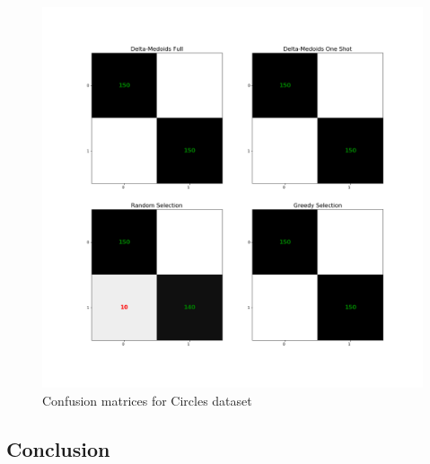 \documentclass[thesis=B,english]{FITthesis}[2012/10/20]
\begin{document}
\begin{figure}[H]
   \includegraphics[width=\linewidth]{img/exp2_circles.png}
  \caption{Confusion matrices for Circles dataset}
  \label{img:exp2_circles}
\end{figure}


\subsection{Conclusion}
\end{document}
